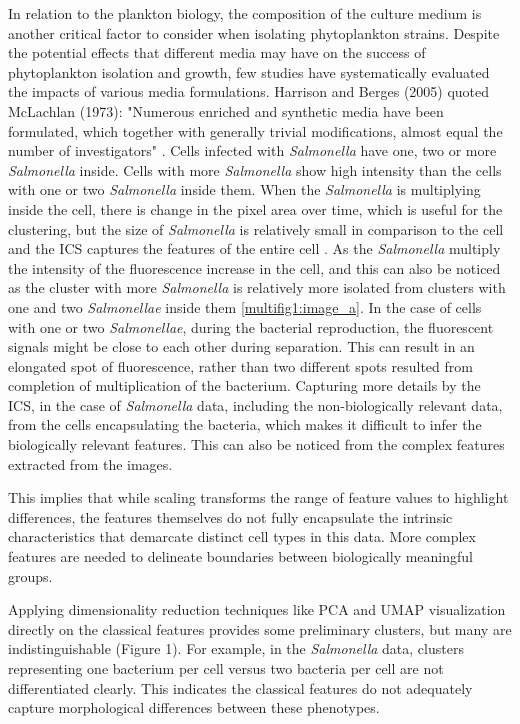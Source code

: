 \documentclass[12pt,a4paper]{article}
\begin{document}
In relation to the plankton biology, the composition of the culture medium is another critical factor to consider when isolating phytoplankton strains. Despite the potential effects that different media may have on the success of phytoplankton isolation and growth, few studies have systematically evaluated the impacts of various media formulations. Harrison and Berges (2005) quoted McLachlan (1973): "Numerous enriched and synthetic media have been formulated, which together with generally trivial modifications, almost equal the number of investigators" \cite{HarrisonPaul}. Cells infected with \textit{Salmonella} have one, two or more \textit{Salmonella} inside. Cells with more \textit{Salmonella} show high intensity than the cells with one or two \textit{Salmonella} inside them. When the \textit{Salmonella} is multiplying inside the cell, there is change in the pixel area over time, which is useful for the clustering, but the size of \textit{Salmonella} is relatively small in comparison to the cell and the ICS captures the features of the entire cell \cite{fàbrega_vila_2013}. As the \textit{Salmonella} multiply the intensity of the fluorescence increase in the cell, and this can also be noticed as the cluster with more \textit{Salmonella} is relatively more isolated from clusters with one and two \textit{Salmonellae} inside them \ref{multifig1:image_a}. In the case of cells with one or two \textit{Salmonellae}, during the bacterial reproduction, the fluorescent signals might be close to each other during separation. This can result in an elongated spot of fluorescence, rather than two different spots resulted from completion of multiplication of the bacterium. Capturing more details by the ICS, in the case of \textit{Salmonella} data, including the non-biologically relevant data, from the cells encapsulating the bacteria, which makes it difficult to infer the biologically relevant features. This can also be noticed from the complex features extracted from the images.

This implies that while scaling transforms the range of feature values to highlight differences, the features themselves do not fully encapsulate the intrinsic characteristics that demarcate distinct cell types in this data. More complex features are needed to delineate boundaries between biologically meaningful groups.

Applying dimensionality reduction techniques like PCA and UMAP visualization directly on the classical features provides some preliminary clusters, but many are indistinguishable (Figure 1). For example, in the \textit{Salmonella} data, clusters representing one bacterium per cell versus two bacteria per cell are not differentiated clearly. This indicates the classical features do not adequately capture morphological differences between these phenotypes.
\end{document}
